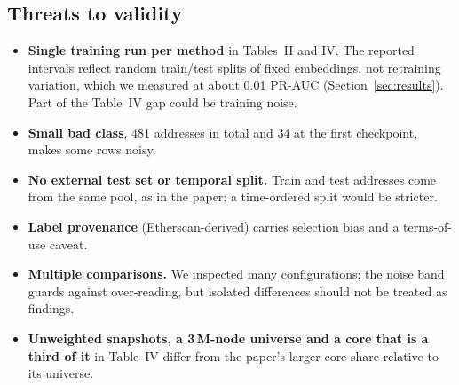 \documentclass[11pt,a4paper]{article}
\begin{document}
\subsection{Threats to validity}
\begin{itemize}
\item \textbf{Single training run per method} in Tables~II and IV. The reported intervals reflect random train/test splits of fixed embeddings, not retraining variation, which we measured at about 0.01 PR-AUC (Section~\ref{sec:results}). Part of the Table~IV gap could be training noise.
\item \textbf{Small bad class}, 481 addresses in total and 34 at the first checkpoint, makes some rows noisy.
\item \textbf{No external test set or temporal split.} Train and test addresses come from the same pool, as in the paper; a time-ordered split would be stricter.
\item \textbf{Label provenance} (Etherscan-derived) carries selection bias and a terms-of-use caveat.
\item \textbf{Multiple comparisons.} We inspected many configurations; the noise band guards against over-reading, but isolated differences should not be treated as findings.
\item \textbf{Unweighted snapshots, a 3\,M-node universe and a core that is a third of it} in Table~IV differ from the paper's larger core share relative to its universe.
\end{itemize}

\end{document}
